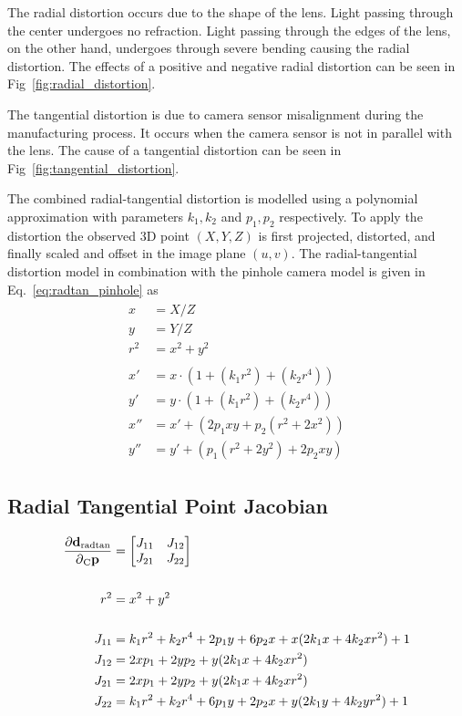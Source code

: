 The radial distortion occurs due to the shape of the lens. Light passing
through the center undergoes no refraction. Light passing through the edges of
the lens, on the other hand, undergoes through severe bending causing the
radial distortion. The effects of a positive and negative radial distortion can
be seen in Fig~\ref{fig:radial_distortion}.

The tangential distortion is due to camera sensor misalignment during the
manufacturing process. It occurs when the camera sensor is not in parallel with
the lens. The cause of a tangential distortion can be seen in
Fig~\ref{fig:tangential_distortion}.

The combined radial-tangential distortion is modelled using a polynomial
approximation with parameters $k_{1}, k_{2}$ and $p_{1}, p_{2}$ respectively.
To apply the distortion the observed 3D point $(X, Y, Z)$ is first projected,
distorted, and finally scaled and offset in the image plane $(u, v)$. The
radial-tangential distortion model in combination with the pinhole camera model
is given in Eq.~\eqref{eq:radtan_pinhole} as
%
\begin{align}
  \begin{split}
    x &= X / Z \\
    y &= Y / Z \\
    r^2 &= x^2 + y^2 \\ \\ 
    x' &= x \cdot (1 + (k_1 r^2) + (k_2 r^4)) \\
    y' &= y \cdot (1 + (k_1 r^2) + (k_2 r^4)) \\
    x'' &= x' + (2 p_1 x y + p_2 (r^2 + 2 x^2)) \\
    y'' &= y' + (p_1 (r^2 + 2 y^2) + 2 p_2 x y)
  \end{split}
\end{align}




\subsection{Radial Tangential Point Jacobian}

\begin{align}
  \begin{split}
    \dfrac{\partial{{\mathbf{d}}_{\text{radtan}}}}{\partial{{{{{}_{{\text{C}}}} {{\mathbf{p}}}_{}}}}} &=
      \begin{bmatrix}
        J_{11} & J_{12} \\
        J_{21} & J_{22}
      \end{bmatrix} \\ \\
      r^2 &= x^2 + y^2 \\ \\
      J_{11} &= k_1 r^2 + k_2 r^4 + 2 p_1 y + 6 p_2 x + x (2 k_1 x + 4 k_2 x r^2) + 1 \\
      J_{12} &= 2 x p_1 + 2 y p_2 + y (2 k_1 x + 4 k_2 x r^2) \\
      J_{21} &= 2 x p_1 + 2 y p_2 + y (2 k_1 x + 4 k_2 x r^2) \\
      J_{22} &= k_1 r^2 + k_2 r^4 + 6 p_1 y + 2 p_2 x + y (2 k_1 y + 4 k_2 y r^2) + 1
    \end{split}
\end{align}


